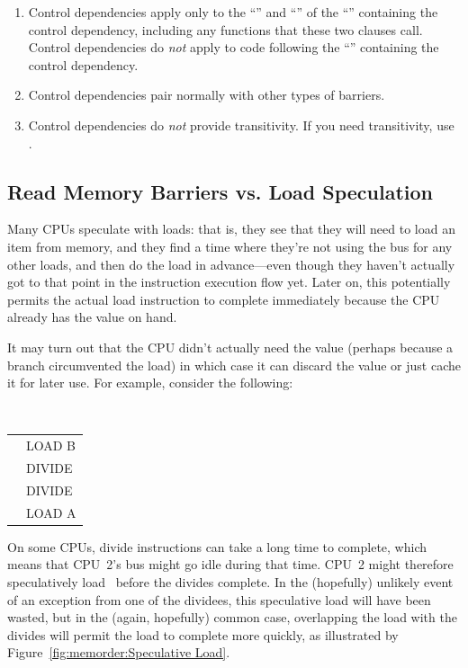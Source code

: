\begin{enumerate}
\item	Control dependencies apply only to the ``'' and
	``'' of the ``'' containing the control
	dependency, including any functions that these two clauses call.
	Control dependencies do \emph{not} apply to code following the
	``'' containing the control dependency.

\item	Control dependencies pair normally with other types of barriers.

\item	Control dependencies do \emph{not} provide transitivity.
	If you need transitivity, use .
\end{enumerate}

\subsection{Read Memory Barriers vs. Load Speculation}
\label{sec:memorder:Read Memory Barriers vs. Load Speculation}

Many CPUs speculate with loads: that is, they see that they will need to
load an item from memory, and they find a time where they're not using
the bus for any other loads, and then do the load in advance---even though
they haven't actually got to that point in the instruction execution
flow yet.
Later on, this potentially permits the actual load instruction to
complete immediately because the CPU already has the value on hand.

It may turn out that the CPU didn't actually need the value (perhaps because a
branch circumvented the load) in which case it can discard the value or just
cache it for later use.
For example, consider the following:

\vspace{5pt}
\begin{minipage}[t]{\columnwidth}
\tt
\scriptsize
\begin{tabular}{l|p{1.5in}}
	\nf{CPU 1} &	\nf{CPU 2} \\
	\hline
		&	LOAD B \\
		&	DIVIDE \\
		&	DIVIDE \\
		&	LOAD A \\
\end{tabular}
\end{minipage}
\vspace{5pt}

On some CPUs, divide instructions can take a long time to complete,
which means that CPU~2's bus might go idle during that time.
CPU~2 might therefore speculatively load~ before the divides
complete.
In the (hopefully) unlikely event of an exception from one of the dividees,
this speculative load will have been wasted, but in the (again, hopefully)
common case, overlapping the load with the divides will permit the load
to complete more quickly, as illustrated by
Figure~\ref{fig:memorder:Speculative Load}.


